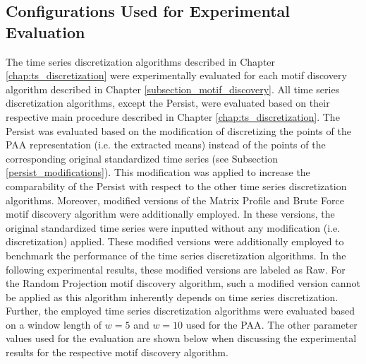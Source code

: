 \subsection*{Configurations Used for Experimental Evaluation}
The time series discretization algorithms described in Chapter \ref{chap:ts_discretization} were experimentally evaluated for each motif discovery algorithm described in Chapter \ref{subsection_motif_discovery}. All time series discretization algorithms, except the Persist, were evaluated based on their respective main procedure described in Chapter \ref{chap:ts_discretization}. The Persist was evaluated based on the modification of discretizing the points of the \ac{PAA} representation (i.e. the extracted means) instead of the points of the corresponding original standardized time series (see Subsection \ref{persist_modifications}). This modification was applied to increase the comparability of the Persist with respect to the other time series discretization algorithms. \newline
Moreover, modified versions of the Matrix Profile and Brute Force motif discovery algorithm were additionally employed. In these versions, the original standardized time series were inputted without any modification (i.e. discretization) applied. These modified versions were additionally employed to benchmark the performance of the time series discretization algorithms. In the following experimental results, these modified versions are labeled as Raw. For the Random Projection motif discovery algorithm, such a modified version cannot be applied as this algorithm inherently depends on time series discretization. \newline
Further, the employed time series discretization algorithms were evaluated based on a window length of $w = 5$ and $w = 10$ used for the \ac{PAA}. The other parameter values used for the evaluation are shown below when discussing the experimental results for the respective motif discovery algorithm.
